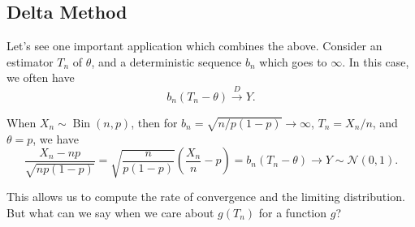 \subsection{Delta Method}
Let's see one important application which combines the above. Consider an estimator \(T_n\) of \(\theta \), and a deterministic sequence \(b_n\) which goes to \(\infty \). In this case, we often have
\[
	b_n (T_n - \theta ) \overset{D}{\to } Y.
\]

\begin{eg}
	When \(X_n \sim \operatorname{Bin}(n, p) \), then for \(b_n = \sqrt{n / p (1 - p)} \to \infty \), \(T_n = X_n / n\), and \(\theta = p\), we have
	\[
		\frac{X_n - n p}{\sqrt{n p (1 - p)} }
		= \sqrt{\frac{n}{p (1 - p)}} \left( \frac{X_n}{n} - p \right)
		= b_n (T_n - \theta )
		\to Y \sim \mathcal{N} (0, 1).
	\]
\end{eg}

This allows us to compute the rate of convergence and the limiting distribution. But what can we say when we care about \(g(T_n)\) for a function \(g\)?

